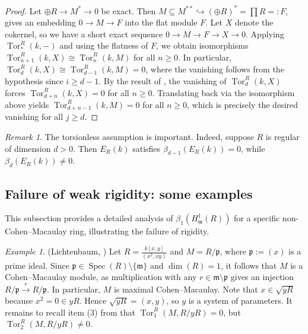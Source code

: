 \documentclass[11pt,a4paper]{amsart}
\numberwithin{equation}{section}
\theoremstyle{definition}
\theoremstyle{remark}
\newtheorem{remark}[theorem]{Remark}
\newtheorem{example}[theorem]{Example}
\newcommand{\Spec}{\operatorname{Spec}}
\newcommand{\fm}{\mathfrak{m}}
\newcommand{\fp}{\mathfrak{p}}
\begin{document}
\begin{proof}
Let $\oplus R\to M^\ast\to 0$ be exact. Then $M\subseteq M^{\ast\ast}\hookrightarrow(\oplus R)^\ast=\prod R=:F$, 	gives an embedding \(0\to M\to F\) into the flat module \(F\). Let \(X\) denote the cokernel, so we have a short exact sequence
$0 \to M \to F \to X \to 0.$
Applying \(\operatorname{Tor}_*^R(k,-)\) and using the flatness of \(F\), we obtain isomorphisms \(\operatorname{Tor}_{n+1}^R(k,X)\cong \operatorname{Tor}_n^R(k,M)\) for all \(n\ge 0\). In particular, \(\operatorname{Tor}_d^R(k,X)\cong \operatorname{Tor}_{d-1}^R(k,M)=0\), where the vanishing follows from the hypothesis since \(i\ge d-1\). By the result of \cite{IYENGAR}, the vanishing of \(\operatorname{Tor}_d^R(k,X)\) forces \(\operatorname{Tor}_{d+n}^R(k,X)=0\) for all \(n\ge 0\). Translating back via the isomorphism above yields \(\operatorname{Tor}_{d+n-1}^R(k,M)=0\) for all \(n\ge 0\), which is precisely the desired vanishing for all \(j\ge d\).
\end{proof}




\begin{remark}
The torsionless assumption is important. Indeed, suppose $R$ is regular of dimension $d>0$. Then \(E_R(k)\) satisfies \(\beta_{d-1}(E_R(k))=0\), while \(\beta_{d}(E_R(k))\neq 0\). 
\end{remark}

\subsection{Failure of weak rigidity: some examples}

This subsection provides a detailed analysis of \(\beta_1(H^1_{\mathfrak{m}}(R))\) for a specific non-Cohen--Macaulay ring, illustrating the failure of rigidity.

\begin{example}(Lichtenbaum, \cite{L})
Let \(R=\frac{k[x,y]}{(x^2,xy)}\) and \(M=R/\fp\), where \(\fp:=(x)\) is a prime ideal. Since $\fp\in \Spec(R)\setminus \{\fm\}$  and $\dim(R)=1$, it follows that \(M\) is a  Cohen--Macaulay module, as multiplication with any $r\in\fm\setminus \fp$ gives an injection \(R/\fp \stackrel{r}\longrightarrow R/\fp\). In particular, $M$ is maximal Cohen--Macaulay.  Note that \(x \in \sqrt{yR}\) because \(x^2=0 \in yR\). Hence \(\sqrt{yR}=(x,y)\), so \(y\) is a system of parameters. It remains to recall item (3) from \cite[Page 226]{L} that \(\operatorname{Tor}_1^R(M,R/yR)=0\), but \(\operatorname{Tor}_2^R(M,R/yR)\neq 0\).
\end{example}
\end{document}
